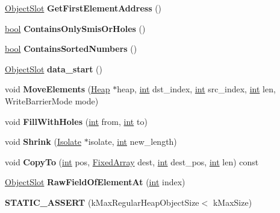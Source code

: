 \begin{DoxyCompactItemize}
\mbox{\hyperlink{classv8_1_1internal_1_1ObjectSlot}{Object\+Slot}} {\bfseries Get\+First\+Element\+Address} ()
\item 
\mbox{\label{classv8_1_1internal_1_1FixedArray_a22676358d865881a11d55fdcc2cb8a8d}} 
\mbox{\hyperlink{classbool}{bool}} {\bfseries Contains\+Only\+Smis\+Or\+Holes} ()
\item 
\mbox{\label{classv8_1_1internal_1_1FixedArray_a91483d680b5d2d6f5d64a8d867a36c8a}} 
\mbox{\hyperlink{classbool}{bool}} {\bfseries Contains\+Sorted\+Numbers} ()
\item 
\mbox{\label{classv8_1_1internal_1_1FixedArray_aeb44255a89d66e37554e6526ff1242ee}} 
\mbox{\hyperlink{classv8_1_1internal_1_1ObjectSlot}{Object\+Slot}} {\bfseries data\+\_\+start} ()
\item 
\mbox{\label{classv8_1_1internal_1_1FixedArray_a9756aeadb57e7c233e3e2f18ee8606f1}} 
void {\bfseries Move\+Elements} (\mbox{\hyperlink{classv8_1_1internal_1_1Heap}{Heap}} $\ast$heap, \mbox{\hyperlink{classint}{int}} dst\+\_\+index, \mbox{\hyperlink{classint}{int}} src\+\_\+index, \mbox{\hyperlink{classint}{int}} len, Write\+Barrier\+Mode mode)
\item 
\mbox{\label{classv8_1_1internal_1_1FixedArray_aad3f35474e49dd5143b5f2334926ce33}} 
void {\bfseries Fill\+With\+Holes} (\mbox{\hyperlink{classint}{int}} from, \mbox{\hyperlink{classint}{int}} to)
\item 
\mbox{\label{classv8_1_1internal_1_1FixedArray_ada91713c9bb43b9c81493b3d447053e2}} 
void {\bfseries Shrink} (\mbox{\hyperlink{classv8_1_1internal_1_1Isolate}{Isolate}} $\ast$isolate, \mbox{\hyperlink{classint}{int}} new\+\_\+length)
\item 
\mbox{\label{classv8_1_1internal_1_1FixedArray_a9b5897e8b0fd24f9f04b51be3e2ba4f8}} 
void {\bfseries Copy\+To} (\mbox{\hyperlink{classint}{int}} pos, \mbox{\hyperlink{classv8_1_1internal_1_1FixedArray}{Fixed\+Array}} dest, \mbox{\hyperlink{classint}{int}} dest\+\_\+pos, \mbox{\hyperlink{classint}{int}} len) const
\item 
\mbox{\label{classv8_1_1internal_1_1FixedArray_a8655489c7e6898fc7339578c3d032b53}} 
\mbox{\hyperlink{classv8_1_1internal_1_1ObjectSlot}{Object\+Slot}} {\bfseries Raw\+Field\+Of\+Element\+At} (\mbox{\hyperlink{classint}{int}} index)
\item 
\mbox{\label{classv8_1_1internal_1_1FixedArray_a69a1a4c50ca27536d7c11d88f5fa4d28}} 
{\bfseries S\+T\+A\+T\+I\+C\+\_\+\+A\+S\+S\+E\+RT} (k\+Max\+Regular\+Heap\+Object\+Size$<$ k\+Max\+Size)
\end{DoxyCompactItemize}
